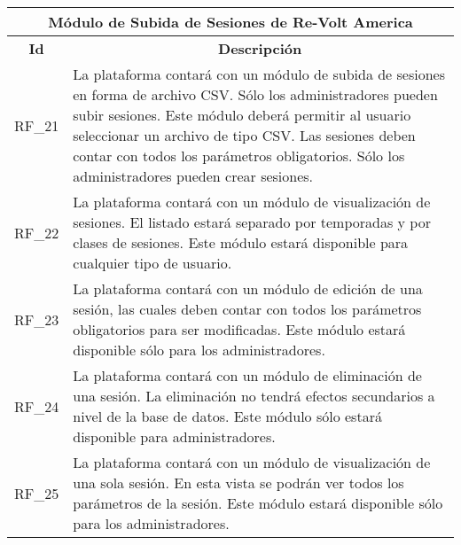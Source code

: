 \begin{center}
	\begin{tabular}{ | l | p{15cm} |}
		\hline
		\multicolumn{2}{|c|}{\textbf{Módulo de Subida de Sesiones de Re-Volt America}} \\
		\hline
		\multicolumn{1}{|c|}{\textbf{Id}} & \multicolumn{1}{|c|}{\textbf{Descripción}} \\
		\hline
		RF\_21 & La plataforma contará con un módulo de subida de sesiones en forma de archivo CSV. Sólo los administradores pueden subir sesiones. Este módulo deberá permitir al usuario seleccionar un archivo de tipo CSV. Las sesiones deben contar con todos los parámetros obligatorios. Sólo los administradores pueden crear sesiones. \\ \hline
		
		RF\_22 & La plataforma contará con un módulo de visualización de sesiones. El listado estará separado por temporadas y por clases de sesiones. Este módulo estará disponible para cualquier tipo de usuario. \\ \hline
		
		RF\_23 & La plataforma contará con un módulo de edición de una sesión, las cuales deben contar con todos los parámetros obligatorios para ser modificadas. Este módulo estará disponible sólo para los administradores. \\ \hline
		
		RF\_24 & La plataforma contará con un módulo de eliminación de una sesión. La eliminación no tendrá efectos secundarios a nivel de la base de datos. Este módulo sólo estará disponible para administradores. \\ \hline
		
		RF\_25 & La plataforma contará con un módulo de visualización de una sola sesión. En esta vista se podrán ver todos los parámetros de la sesión. Este módulo estará disponible sólo para los administradores. \\ \hline
	\end{tabular}
\end{center}